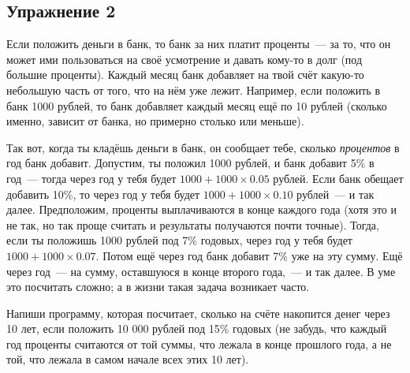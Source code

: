\subsection*{Упражнение 2}
Если положить деньги в банк, то банк за них платит проценты — за то, что он может ими пользоваться на своё усмотрение и давать кому-то в долг (под большие проценты). Каждый месяц банк добавляет на твой счёт какую-то небольшую часть от того, что на нём уже лежит. Например, если положить в банк 1000 рублей, то банк добавляет каждый месяц ещё по 10 рублей (сколько именно, зависит от банка, но примерно столько или меньше).

Так вот, когда ты кладёшь деньги в банк, он сообщает тебе, сколько \emph{процентов} в год банк добавит. Допустим, ты положил 1000 рублей, и банк добавит 5\% в год — тогда через год у тебя будет $1000 + 1000×0.05$ рублей. Если банк обещает добавить 10\%, то через год у тебя будет $1000+1000×0.10$ рублей — и так далее. Предположим, проценты выплачиваются в конце каждого года (хотя это и не так, но так проще считать и результаты получаются почти точные). Тогда, если ты положишь 1000 рублей под 7\% годовых, через год у тебя будет $1000+1000×0.07$. Потом ещё через год банк добавит 7\% уже на эту сумму. Ещё через год — на сумму, оставшуюся в конце второго года, — и так далее. В уме это посчитать сложно; а в жизни такая задача возникает часто.

Напиши программу, которая посчитает, сколько на счёте накопится денег через 10 лет, если положить 10 000 рублей под 15\% годовых (не забудь, что каждый год проценты считаются от той суммы, что лежала в конце прошлого года, а не той, что лежала в самом начале всех этих 10 лет).
\newpage